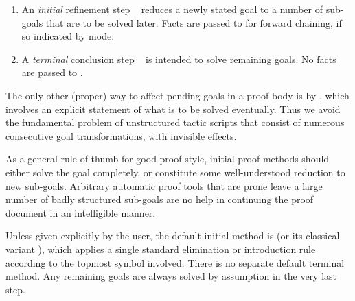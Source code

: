 \begin{isabellebody}
\begin{isamarkuptext}
  \begin{enumerate}

  \item An \emph{initial} refinement step \hyperlink{command.proof}{\mbox{}}~ reduces a newly stated goal to a number
  of sub-goals that are to be solved later.  Facts are passed to
   for forward chaining, if so indicated by  mode.
  
  \item A \emph{terminal} conclusion step \hyperlink{command.qed}{\mbox{}}~ is intended to solve remaining goals.  No facts are
  passed to .

  \end{enumerate}

  The only other (proper) way to affect pending goals in a proof body
  is by \hyperlink{command.show}{\mbox{}}, which involves an explicit statement of
  what is to be solved eventually.  Thus we avoid the fundamental
  problem of unstructured tactic scripts that consist of numerous
  consecutive goal transformations, with invisible effects.

  \medskip As a general rule of thumb for good proof style, initial
  proof methods should either solve the goal completely, or constitute
  some well-understood reduction to new sub-goals.  Arbitrary
  automatic proof tools that are prone leave a large number of badly
  structured sub-goals are no help in continuing the proof document in
  an intelligible manner.

  Unless given explicitly by the user, the default initial method is
  \hyperlink{method.Pure.rule}{\mbox{}} (or its classical variant \hyperlink{method.rule}{\mbox{}}), which applies a single standard elimination or introduction
  rule according to the topmost symbol involved.  There is no separate
  default terminal method.  Any remaining goals are always solved by
  assumption in the very last step.


\end{isamarkuptext}
\end{isabellebody}

